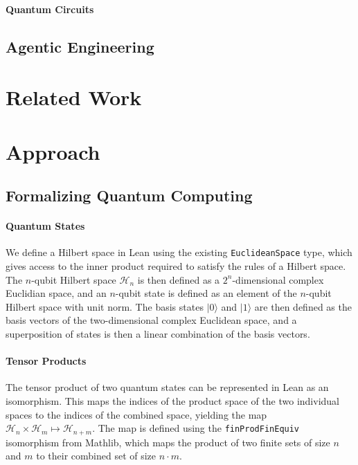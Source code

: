 \documentclass[letterpaper]{article} %
\begin{document}
\paragraph{Quantum Circuits}



\subsection{Agentic Engineering}



\section{Related Work}




\section{Approach}

\subsection{Formalizing Quantum Computing}

\paragraph{Quantum States}

We define a Hilbert space in Lean using the existing \verb|EuclideanSpace| type,
which gives access to the inner product required to satisfy the rules of a Hilbert space.
The $n$-qubit Hilbert space $\mathcal{H}_n$ is then defined as a $2^n$-dimensional complex Euclidian space, and
an $n$-qubit state is defined as an element of the $n$-qubit Hilbert space with unit norm.
The basis states $|0\rangle$ and $|1\rangle$ are then defined as the basis vectors
of the two-dimensional complex Euclidean space, and a superposition of states is then
a linear combination of the basis vectors.

\paragraph{Tensor Products}

The tensor product of two quantum states can be represented in Lean as an isomorphism.
This maps the indices of the product space of the two individual
spaces to the indices of the combined space, yielding
the map $\mathcal{H}_n \times \mathcal{H}_m \mapsto \mathcal{H}_{n+m}$.
The map is defined using the \verb|finProdFinEquiv| isomorphism from Mathlib, which
maps the product of two finite sets of size $n$ and $m$ to their combined set of size $n \cdot m$.
\end{document}
